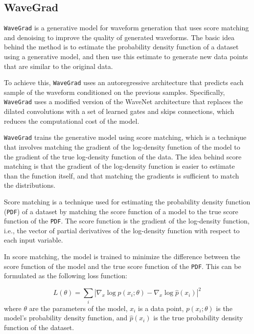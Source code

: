 \documentclass[12pt]{iopart}
\begin{document}

\subsection{WaveGrad}

\texttt{WaveGrad} is a generative model for waveform generation that uses score matching and denoising to improve the quality of generated waveforms. The basic idea behind the method is to estimate the probability density function of a dataset using a generative model, and then use this estimate to generate new data points that are similar to the original data.

To achieve this, \texttt{WaveGrad} uses an autoregressive architecture that predicts each sample of the waveform conditioned on the previous samples. Specifically, \texttt{WaveGrad} uses a modified version of the WaveNet architecture that replaces the dilated convolutions with a set of learned gates and skips connections, which reduces the computational cost of the model.

\texttt{WaveGrad} trains the generative model using score matching, which is a technique that involves matching the gradient of the log-density function of the model to the gradient of the true log-density function of the data. The idea behind score matching is that the gradient of the log-density function is easier to estimate than the function itself, and that matching the gradients is sufficient to match the distributions.

Score matching is a technique used for estimating the probability density function (\texttt{PDF}) of a dataset by matching the score function of a model to the true score function of the \texttt{PDF}. The score function is the gradient of the log-density function, i.e., the vector of partial derivatives of the log-density function with respect to each input variable.

In score matching, the model is trained to minimize the difference between the score function of the model and the true score function of the \texttt{PDF}. This can be formulated as the following loss function:

\begin{equation}
L(\theta) = \sum_i |\nabla_x \log p(x_i; \theta) - \nabla_x \log \hat{p}(x_i)|^2
\end{equation}
where $\theta$ are the parameters of the model, $x_i$ is a data point, $p(x_i; \theta)$ is the model's probability density function, and $\hat{p}(x_i)$ is the true probability density function of the dataset.
\end{document}
